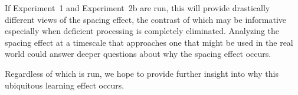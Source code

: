 If Experiment~1 and Experiment~2b are run, this will provide drastically different views of the spacing effect, the contrast of which may be informative especially when deficient processing is completely eliminated.  Analyzing the spacing effect at a timescale that approaches one that might be used in the real world could answer deeper questions about why the spacing effect occurs.

Regardless of which is run, we hope to provide further insight into why this ubiquitous learning effect occurs.








